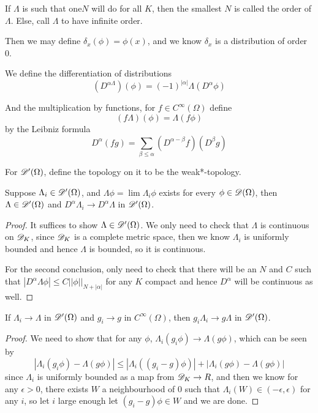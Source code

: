 \begin{definition}
    If $\Lambda$ is such that one$N$ will do for all $K$, then the smallest $N$ is called the order of $\Lambda$. Else, call $\Lambda$ to have infinite order.\par
    Then we may define $\delta_x(\phi) = \phi(x)$, and we know $\delta_x$ is a distribution of order $0$.
\end{definition}

\begin{definition}
    We define the differentiation of distributions
    \[(D^{\alpha\Lambda})(\phi) = (-1)^{|\alpha|}\Lambda(D^{\alpha} \phi)\]\par
    And the multiplication by functions, for $f \in C^{\infty}(\Omega)$ define
    \[
    (f\Lambda)(\phi) = \Lambda(f\phi)
    \]
    by the Leibniz formula
    \[
    D^{\alpha}(fg) = \sum_{\beta \leq \alpha}(D^{\alpha-\beta}f)(D^{\beta }g)
    \]
\end{definition}

\begin{definition}
    For $\mathscr{D}'(\Omega)$, define the topology on it to be the weak*-topology.
\end{definition}

\begin{theorem}
    Suppose $\Lambda_i \in \mathscr{D}'(\Omega)$, and $\Lambda \phi = \lim \Lambda_i \phi$ exists for every $\phi \in \mathscr{D}(\Omega)$, then $\Lambda \in \mathscr{D}'(\Omega)$ and $D^{\alpha}\Lambda_i \to D^{\alpha}\Lambda$ in $\mathscr{D}'(\Omega)$.
\end{theorem}
\begin{proof}
    It suffices to show $\Lambda \in \mathscr{D}'(\Omega)$. We only need to check that $\Lambda$ is continuous on $\mathscr{D}_K$, since $\mathscr{D}_K$ is a complete metric space, then we know $\Lambda_i$ is uniformly bounded and hence $\Lambda$ is bounded, so it is continuous.\par
    For the second conclusion, only need to check that there will be an $N$ and $C$ such that $|D^{\alpha}\Lambda \phi| \leq C||\phi||_{N+|\alpha|}$ for any $K$ compact and hence $D^{\alpha}$ will be continuous as well.
\end{proof}

\begin{theorem}
    If $\Lambda_i \to \Lambda$ in $\mathscr{D}'(\Omega)$ and $g_i \to g$ in $C^{\infty}(\Omega)$, then $g_i\Lambda_i \to g\Lambda$ in $\mathscr{D}'(\Omega)$.
\end{theorem}
\begin{proof}
    We need to show that for any $\phi$, $\Lambda_i(g_i \phi) \to \Lambda(g\phi)$, which can be seen by
    \[
    |\Lambda_i(g_i \phi) - \Lambda(g\phi)| \leq |\Lambda_i((g_i-g)\phi)| + |\Lambda_i(g\phi) - \Lambda(g\phi)|
    \]
    since $\Lambda_i$ is uniformly bounded as a map from $\mathscr{D}_K \to R$, and then we know for any $\epsilon > 0$, there exists $W$ a neighbourhood of $0$ such that $\Lambda_i(W) \in (-\epsilon,\epsilon)$ for any $i$, so let $i$ large enough let $(g_i-g)\phi \in W$ and we are done. 
\end{proof}

